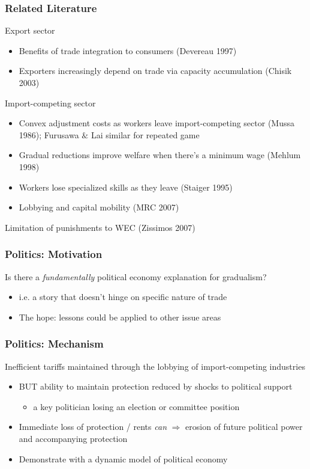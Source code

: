 \documentclass[handout]{beamer}
\begin{document}
\begin{frame}
\frametitle{Related Literature}

\pause
Export sector
\begin{itemize}
  \item \footnotesize Benefits of trade integration to consumers (Devereau 1997)
  \item \footnotesize Exporters increasingly depend on trade via capacity accumulation (Chisik 2003)
\end{itemize}

\pause
Import-competing sector
\begin{itemize}
  \item \footnotesize Convex adjustment costs as workers leave import-competing sector (Mussa 1986); Furusawa $\&$ Lai similar for repeated game
	\item \footnotesize Gradual reductions improve welfare when there's a minimum wage (Mehlum 1998)
	\item \footnotesize Workers lose specialized skills as they leave (Staiger 1995)
	\item \footnotesize Lobbying and capital mobility (MRC 2007)
\end{itemize}

\pause
Limitation of punishments to WEC (Zissimos 2007)

\end{frame}


\begin{frame}
\frametitle{Politics: Motivation}

\pause
Is there a \textit{fundamentally} political economy explanation for gradualism?
\pause
\begin{itemize}
	
	\item i.e. a story that doesn't hinge on specific nature of trade
	\pause
	\item The hope: lessons could be applied to other issue areas
\end{itemize}

\end{frame}


\begin{frame}
\frametitle{Politics: Mechanism}

\pause
Inefficient tariffs maintained through the lobbying of import-competing industries
\pause
\begin{itemize}[<+->]
	\item BUT ability to maintain protection reduced by shocks to political support
		\begin{itemize}
			\item a key politician losing an election or committee position
		\end{itemize}
	\item Immediate loss of protection / rents \textit{can} $\Rightarrow$ erosion of future political power and accompanying protection
	\item Demonstrate with a dynamic model of political economy
\end{itemize}

\end{frame}
\end{document}
